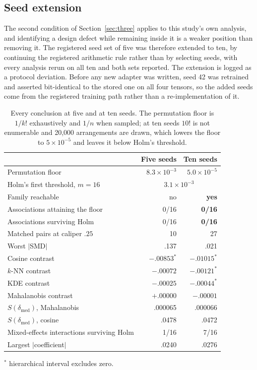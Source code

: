 \documentclass[pdflatex,sn-basic]{sn-jnl}
\theoremstyle{plain}
\theoremstyle{definition}
\theoremstyle{remark}
\begin{document}
\subsection{Seed extension}
\label{sec:seeds}
The second condition of Section~\ref{sec:three} applies to this study's own
analysis, and identifying a design defect while remaining inside it is a weaker
position than removing it. The registered seed set of five was therefore
extended to ten, by continuing the registered arithmetic rule rather than by
selecting seeds, with every analysis rerun on all ten and both sets reported.
The extension is logged as a protocol deviation. Before any new adapter was
written, seed 42 was retrained and asserted bit-identical to the stored one on
all four tensors, so the added seeds come from the registered training path
rather than a re-implementation of it.

\begin{table}[t]
\centering
\caption{Every conclusion at five and at ten seeds. The permutation floor is $1/k!$ exhaustively and $1/n$ when sampled; at ten seeds $10!$ is not enumerable and 20{,}000 arrangements are drawn, which lowers the floor to $5\times10^{-5}$ and leaves it below Holm's threshold.}
\label{tab:seeds}
\small
\begin{tabular}{lrr}
\toprule
& Five seeds & Ten seeds\\
\midrule
Permutation floor & $8.3\times10^{-3}$ & $5.0\times10^{-5}$\\
Holm's first threshold, $m{=}16$ & \multicolumn{2}{c}{$3.1\times10^{-3}$}\\
Family reachable & no & \textbf{yes}\\
Associations attaining the floor & 0/16 & \textbf{0/16}\\
Associations surviving Holm & 0/16 & \textbf{0/16}\\
\midrule
Matched pairs at caliper $.25$ & 10 & 27\\
Worst $|$SMD$|$ & .137 & .021\\
Cosine contrast & $-.00853^\ast$ & $-.01015^\ast$\\
$k$-NN contrast & $-.00072$ & $-.00121^\ast$\\
KDE contrast & $-.00025$ & $-.00044^\ast$\\
Mahalanobis contrast & $+.00000$ & $-.00001$\\
\midrule
$S(\delta_{\mathrm{med}})$, Mahalanobis & .000065 & .000066\\
$S(\delta_{\mathrm{med}})$, cosine & .0478 & .0472\\
Mixed-effects interactions surviving Holm & 1/16 & 7/16\\
Largest $|$coefficient$|$ & .0240 & .0276\\
\bottomrule
\end{tabular}
\par\vspace{2pt}
\footnotesize $^\ast$ hierarchical interval excludes zero.
\end{table}
\end{document}

